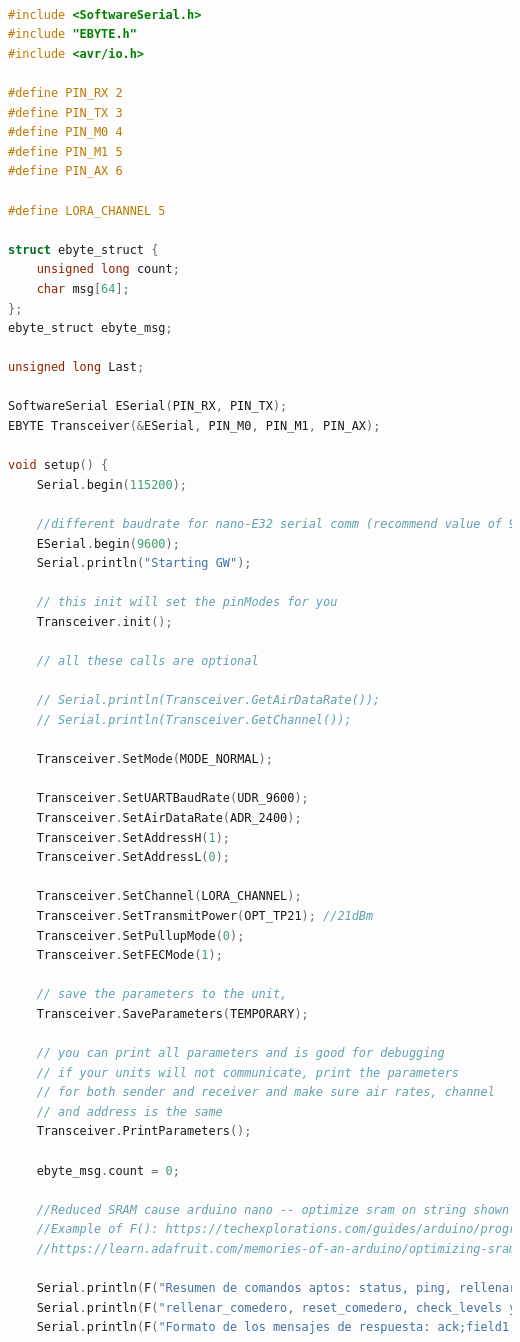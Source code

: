 \documentclass[12pt]{article}
\begin{document}
	\begin{lstlisting}[language=C]

#include <SoftwareSerial.h>
#include "EBYTE.h"
#include <avr/io.h>

#define PIN_RX 2
#define PIN_TX 3
#define PIN_M0 4
#define PIN_M1 5
#define PIN_AX 6

#define LORA_CHANNEL 5

struct ebyte_struct {
	unsigned long count;
	char msg[64];                                           
};
ebyte_struct ebyte_msg;

unsigned long Last;

SoftwareSerial ESerial(PIN_RX, PIN_TX);
EBYTE Transceiver(&ESerial, PIN_M0, PIN_M1, PIN_AX);

void setup() {
	Serial.begin(115200); 
	
	//different baudrate for nano-E32 serial comm (recommend value of 9600)
	ESerial.begin(9600);
	Serial.println("Starting GW");
	
	// this init will set the pinModes for you
	Transceiver.init();
	
	// all these calls are optional
	
	// Serial.println(Transceiver.GetAirDataRate());
	// Serial.println(Transceiver.GetChannel());
	
	Transceiver.SetMode(MODE_NORMAL);
	
	Transceiver.SetUARTBaudRate(UDR_9600);
	Transceiver.SetAirDataRate(ADR_2400);
	Transceiver.SetAddressH(1);
	Transceiver.SetAddressL(0);
	
	Transceiver.SetChannel(LORA_CHANNEL);
	Transceiver.SetTransmitPower(OPT_TP21); //21dBm
	Transceiver.SetPullupMode(0);
	Transceiver.SetFECMode(1);
	
	// save the parameters to the unit,
	Transceiver.SaveParameters(TEMPORARY);
	
	// you can print all parameters and is good for debugging
	// if your units will not communicate, print the parameters
	// for both sender and receiver and make sure air rates, channel
	// and address is the same
	Transceiver.PrintParameters();
	
	ebyte_msg.count = 0;
	
	//Reduced SRAM cause arduino nano -- optimize sram on string shown on Serial.println using "F" function 
	//Example of F(): https://techexplorations.com/guides/arduino/programming/f-macro/
	//https://learn.adafruit.com/memories-of-an-arduino/optimizing-sram
	
	Serial.println(F("Resumen de comandos aptos: status, ping, rellenar_bebedero,"));
	Serial.println(F("rellenar_comedero, reset_comedero, check_levels y update_oled"));
	Serial.println(F("Formato de los mensajes de respuesta: ack;field1;var1"));
	

\end{lstlisting}
\end{document}
